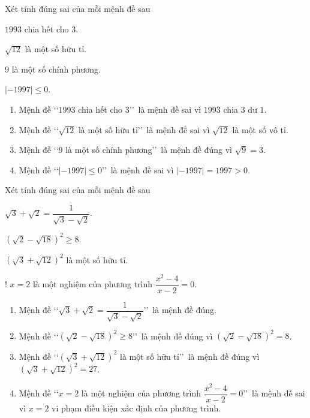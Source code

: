 \begin{bt}%
	Xét tính đúng sai của mỗi mệnh đề sau
	\begin{listEX}[2]
		\item $1993$ chia hết cho $3$.
		\item $\sqrt{12}$ là một số hữu tỉ.
		\item $9$ là một số chính phương.
		\item $|-1997|\leqslant0$.
	\end{listEX}
	\loigiai
	{
		\begin{enumerate}
			\item Mệnh đề \lq\lq  $1993$ chia hết cho $3$\rq\rq\ là mệnh đề sai vì $1993$ chia $3$ dư $1$.
			\item Mệnh đề \lq\lq  $\sqrt{12}$ là một số hữu tỉ\rq\rq\ là mệnh đề sai vì $\sqrt{12}$ là một số vô tỉ.
			\item Mệnh đề \lq\lq  $9$ là một số chính phương\rq\rq\ là mệnh đề đúng vì $\sqrt{9}=3$.
			\item Mệnh đề \lq\lq  $|-1997|\leqslant0$\rq\rq\ là mệnh đề sai vì $|-1997|=1997>0$.
		\end{enumerate}
	}
\end{bt}

\begin{bt}%
	Xét tính đúng sai của mỗi mệnh đề sau
	\begin{listEX}[3]
		\item $\sqrt{3}+\sqrt{2}=\dfrac{1}{\sqrt{3}-\sqrt{2}}$.
		\item $\left(\sqrt{2}-\sqrt{18}\right)^2\geqslant8$.
		\item $\left(\sqrt{3}+\sqrt{12}\right)^2$ là một số hữu tỉ.
		\item! $x=2$ là một nghiệm của phương trình $\dfrac{x^2-4}{x-2}=0$.
	\end{listEX}
	\loigiai
	{
		\begin{enumerate}
			\item Mệnh đề \lq\lq  $\sqrt{3}+\sqrt{2}=\dfrac{1}{\sqrt{3}-\sqrt{2}}$\rq\rq\ là mệnh đề đúng.
			\item Mệnh đề \lq\lq  $\left(\sqrt{2}-\sqrt{18}\right)^2\geqslant8$\rq\rq\ là mệnh đề đúng vì $\left(\sqrt{2}-\sqrt{18}\right)^2=8$.
			\item Mệnh đề \lq\lq  $\left(\sqrt{3}+\sqrt{12}\right)^2$ là một số hữu tỉ\rq\rq\ là mệnh đề đúng vì $\left(\sqrt{3}+\sqrt{12}\right)^2=27$.
			\item Mệnh đề \lq\lq  $x=2$ là một nghiệm của phương trình $\dfrac{x^2-4}{x-2}=0$\rq\rq\ là mệnh đề sai vì $x=2$ vi phạm điều kiện xác định của phương trình.
		\end{enumerate}
	}
\end{bt}


